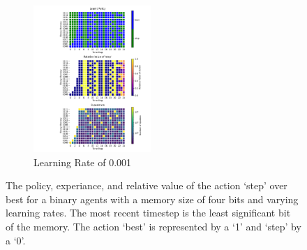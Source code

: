 \documentclass[a4paper]{article}
\begin{document}
\begin{figure}[ht]
    \begin{subfigure}[b]{0.24\textwidth}
        \centering
        \includegraphics[width=12em]{../figures/policy_b4_lr001.pdf}
        \caption{Learning Rate of 0.001}
        \label{b4_lr001}
    \end{subfigure}
    \caption{
        The policy, experiance, and relative value of the action `step'
        over best for a binary agents with a memory size of four bits
        and varying learning rates. The most recent timestep
        is the least significant bit of the memory.
        The action `best' is represented by a `1' and `step' by a `0'.
    }
    \label{policy_b4}
\end{figure}
\end{document}
